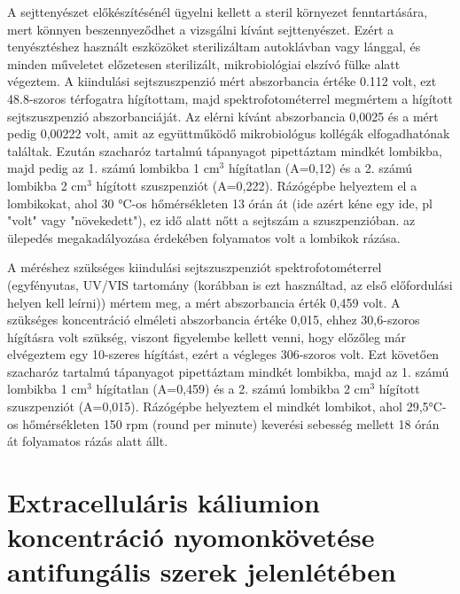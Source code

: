 A sejttenyészet előkészítésénél ügyelni kellett a steril környezet fenntartására, mert könnyen beszennyeződhet a vizsgálni kívánt sejttenyészet. Ezért a tenyésztéshez használt eszközöket sterilizáltam autoklávban vagy lánggal, és minden műveletet előzetesen sterilizált, mikrobiológiai elszívó fülke alatt végeztem. A kiindulási sejtszuszpenzió mért abszorbancia értéke 0.112 volt, ezt 48.8-szoros térfogatra hígítottam, majd spektrofotométerrel megmértem a hígított sejtszuszpenzió abszorbanciáját. Az elérni kívánt abszorbancia 0,0025 és a mért pedig 0,00222 volt, amit az együttműködő mikrobiológus kollégák elfogadhatónak találtak. Ezután szacharóz tartalmú tápanyagot pipettáztam mindkét lombikba, majd pedig az 1. számú lombikba 1 cm$^3$ hígítatlan (A=0,12) és a 2. számú lombikba 2 cm$^3$ hígított szuszpenziót (A=0,222). Rázógépbe helyeztem el a lombikokat, ahol 30 °C-os hőmérsékleten 13 órán át (ide azért kéne egy ide, pl "volt" vagy "növekedett"), ez idő alatt nőtt a sejtszám a szuszpenzióban. az ülepedés megakadályozása érdekében folyamatos volt a lombikok rázása. 

A méréshez szükséges kiindulási sejtszuszpenziót spektrofotométerrel (egyfényutas, UV/VIS tartomány (korábban is ezt használtad, az első előfordulási helyen kell leírni)) mértem meg, a mért abszorbancia érték 0,459 volt. A szükséges koncentráció elméleti abszorbancia értéke 0,015, ehhez 30,6-szoros hígításra volt szükség, viszont figyelembe kellett venni, hogy előzőleg már elvégeztem egy 10-szeres hígítást, ezért a végleges 306-szoros volt. Ezt követően szacharóz tartalmú tápanyagot pipettáztam mindkét lombikba, majd az 1. számú lombikba 1 cm$^3$ hígítatlan (A=0,459) és a 2. számú lombikba 2 cm$^3$ hígított szuszpenziót (A=0,015).  Rázógépbe helyeztem el mindkét lombikot, ahol 29,5°C-os hőmérsékleten 150 rpm (round per minute) keverési sebesség mellett 18 órán át folyamatos rázás alatt állt.

\section{Extracelluláris káliumion koncentráció nyomonkövetése antifungális szerek jelenlétében}

